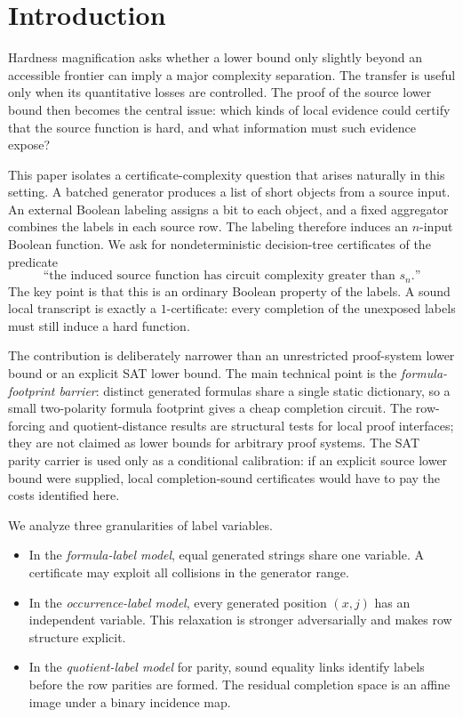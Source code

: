 \documentclass[11pt]{article}
\theoremstyle{definition}
\begin{document}
\section{Introduction}

Hardness magnification asks whether a lower bound only slightly beyond an accessible frontier can imply a major complexity separation.  The transfer is useful only when its quantitative losses are controlled.  The proof of the source lower bound then becomes the central issue: which kinds of local evidence could certify that the source function is hard, and what information must such evidence expose?

This paper isolates a certificate-complexity question that arises naturally in this setting.  A batched generator produces a list of short objects from a source input.  An external Boolean labeling assigns a bit to each object, and a fixed aggregator combines the labels in each source row.  The labeling therefore induces an $n$-input Boolean function.  We ask for nondeterministic decision-tree certificates of the predicate
\[
  \text{``the induced source function has circuit complexity greater than $s_n$.''}
\]
The key point is that this is an ordinary Boolean property of the labels.  A sound local transcript is exactly a $1$-certificate: every completion of the unexposed labels must still induce a hard function.

The contribution is deliberately narrower than an unrestricted proof-system lower bound or an explicit SAT lower bound.  The main technical point is the \emph{formula-footprint barrier}: distinct generated formulas share a single static dictionary, so a small two-polarity formula footprint gives a cheap completion circuit.  The row-forcing and quotient-distance results are structural tests for local proof interfaces; they are not claimed as lower bounds for arbitrary proof systems.  The SAT parity carrier is used only as a conditional calibration: if an explicit source lower bound were supplied, local completion-sound certificates would have to pay the costs identified here.

We analyze three granularities of label variables.

\begin{itemize}
  \item In the \emph{formula-label model}, equal generated strings share one variable.  A certificate may exploit all collisions in the generator range.
  \item In the \emph{occurrence-label model}, every generated position $(x,j)$ has an independent variable.  This relaxation is stronger adversarially and makes row structure explicit.
  \item In the \emph{quotient-label model} for parity, sound equality links identify labels before the row parities are formed.  The residual completion space is an affine image under a binary incidence map.
\end{itemize}
\end{document}

